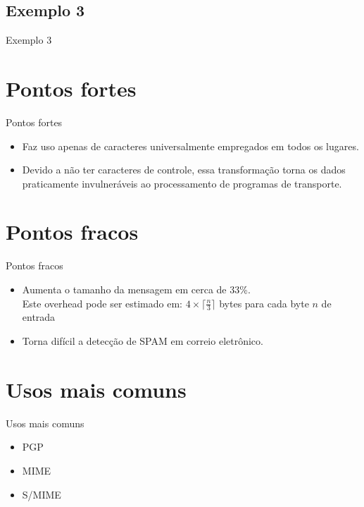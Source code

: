 \documentclass[pdf]{beamer}
\begin{document}
\subsection{Exemplo 3}
\begin{frame}{Exemplo 3}
\transdissolve
\begin{table}
\begin{center}
\end{center}
\end{table}
\end{frame}
\section{Pontos fortes}
\begin{frame}{Pontos fortes}
\transdissolve
\begin{itemize}
\item Faz uso apenas de caracteres universalmente empregados em todos os lugares.
\item Devido a não ter caracteres de controle, essa transformação torna os dados praticamente invulneráveis ao processamento de programas de transporte.
\end{itemize}
\end{frame}
\section{Pontos fracos}
\begin{frame}{Pontos fracos}
\transdissolve
\begin{itemize}
\item Aumenta o tamanho da mensagem em cerca de 33\%. \\
Este overhead pode ser estimado em: $4 \times \lceil \frac{n}{3} \rceil$ bytes para cada byte $n$ de entrada
\item Torna difícil a detecção de SPAM em correio eletrônico.
\end{itemize}
\end{frame}
\section{Usos mais comuns}
\begin{frame}{Usos mais comuns}
\transdissolve
\begin{itemize}
\item PGP
\item MIME
\item S/MIME
\end{itemize}
\end{frame}
\end{document}

